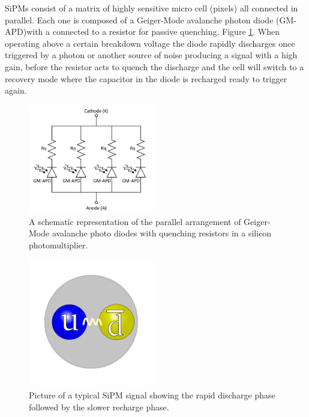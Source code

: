 SiPMs consist of a matrix of highly sensitive micro cell (pixels) all connected in parallel. Each one is composed of a Geiger-Mode avalanche photon diode (GM-APD)with a connected to a resistor for passive quenching, Figure \ref{SiPMCircuit}. When operating above a certain breakdown voltage the diode rapidly discharges once triggered by a photon or another source of noise producing a signal with a high gain, before the resistor acts to quench the discharge and the cell will switch to a recovery mode where the capacitor in the diode is recharged ready to trigger again. 

\begin{figure}[!ht]
	\centering
	\includegraphics[width=0.5\textwidth]{ImgChap1/SiPM1}
	\caption{A schematic representation of the parallel arrangement of Geiger-Mode avalanche photo diodes with quenching resistors in a silicon photomultiplier. \cite{website:AdvanSiDSiPMpdf}}
	\label{SiPMCircuit}
\end{figure}

\begin{figure}[!ht]
	\centering
	\includegraphics[width=0.5\textwidth]{ImgChap1/Meson2}
	\caption{Picture of a typical SiPM signal showing the rapid discharge phase followed by the slower recharge phase.}
	\label{SiPMDischargeRecharge}
\end{figure}

